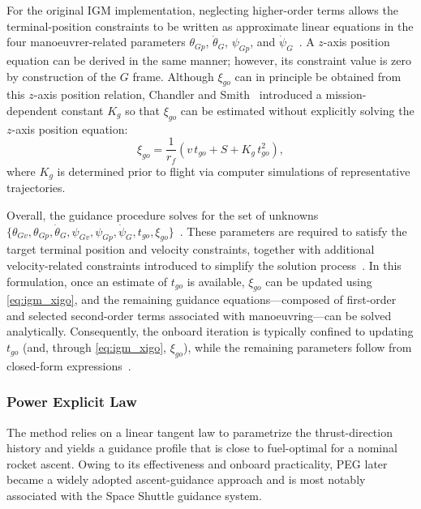 For the original IGM implementation, neglecting higher-order terms allows the terminal-position constraints to be written as approximate linear equations in the four manoeuvrer-related parameters
$\theta_{Gp}$, $\dot{\theta}_G$, $\psi_{Gp}$, and $\dot{\psi}_G$~\cite{SONG2015463}.
A $z$-axis position equation can be derived in the same manner; however, its constraint value is zero by construction of the $G$ frame. Although $\xi_{go}$ can in principle be obtained from this $z$-axis position relation, Chandler and Smith~\cite{ChandlerSmith1967IterativeGuidanceMode} introduced a mission-dependent constant $K_g$ so that $\xi_{go}$ can be estimated without explicitly solving the $z$-axis position equation:
\begin{equation}
\xi_{go}=\frac{1}{r_f}\left(v\,t_{go}+S+K_g\,t_{go}^2\right),
\label{eq:igm_xigo}
\end{equation}
where $K_g$ is determined prior to flight via computer simulations of representative trajectories.

Overall, the guidance procedure solves for the set of unknowns
$\{\theta_{Gv},\theta_{Gp},\dot{\theta}_G,\psi_{Gv},\psi_{Gp},\dot{\psi}_G,t_{go},\xi_{go}\}$~\cite{SONG2015463}.
These parameters are required to satisfy the target terminal position and velocity constraints, together with additional velocity-related constraints introduced to simplify the solution process~\cite{ChandlerSmith1967IterativeGuidanceMode}. In this formulation, once an estimate of $t_{go}$ is available, $\xi_{go}$ can be updated using \eqref{eq:igm_xigo}, and the remaining guidance equations—composed of first-order and selected second-order terms associated with manoeuvring—can be solved analytically. Consequently, the onboard iteration is typically confined to updating $t_{go}$ (and, through \eqref{eq:igm_xigo}, $\xi_{go}$), while the remaining parameters follow from closed-form expressions~\cite{SONG2015463}.



\subsubsection{Power Explicit Law}
\label{sssec:peg_theory}

The method relies on a linear tangent law to parametrize the thrust-direction history and yields a guidance profile that is close to fuel-optimal for a nominal rocket ascent. Owing to its effectiveness and onboard practicality, PEG later became a widely adopted ascent-guidance approach and is most notably associated with the Space Shuttle guidance system.

